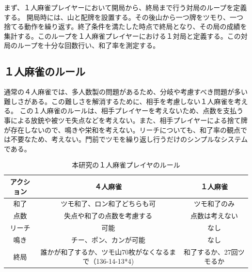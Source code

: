 まず、１人麻雀プレイヤーにおいて開局から、終局まで行う対局のループを定義する。
開局時には、山と配牌を設置する。その後山から一つ牌をツモり、一つ捨てる動作を繰り返す。終了条件を満たした時点で終局となり、その局の成績を集計する。このループを１人麻雀プレイヤーにおける１対局と定義する。この対局のループを十分な回数行い、和了率を測定する。




\subsection{１人麻雀のルール}
通常の４人麻雀では、多人数製の問題があるため、分岐や考慮すべき問題が多い難しさがある。この難しさを解消するために、相手を考慮しない１人麻雀を考える。
この１人麻雀のルールは、相手プレイヤーを考えないため、点数を支払う事による放銃や被ツモ失点などを考えない。また、相手プレイヤーによる捨て牌が存在しないので、鳴きや栄和を考えない。リーチについても、和了率の観点では不要なため、考えない。門前でツモを繰り返し行うだけのシンプルなシステムである。

\begin{table}[htbp]
  \caption{本研究の１人麻雀プレイヤのルール}
  \label{tb:bakuuti_score}
  \begin{center}
  \begin{tabular}{c|c|c}
    \hline
    アクション  & ４人麻雀 & １人麻雀 \\\hline\hline
    和了  & ツモ和了、ロン和了どちらも可 & ツモ和了のみ\\\hline
    点数 & 失点や和了の点数を考慮する & 点数は考えない\\\hline
    リーチ & 可能 & なし\\\hline
    鳴き & チー、ポン、カンが可能 & なし\\\hline
    終局 & 誰かが和了するか、ツモ山70枚がなくなるまで（136-14-13*4) & 和了するか、27回ツモるか\\\hline
  \end{tabular}\end{center}
\end{table}

